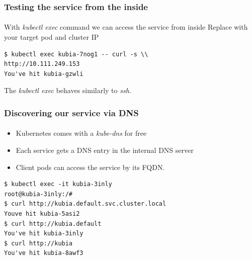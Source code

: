 \begin{frame}[fragile]
	\frametitle{Testing the service from the inside}
	\framesubtitle{}
	With \textit{kubectl exec} command we can access the service from inside
	Replace with your target pod and cluster IP
	\begin{lstlisting}[numbers=none, basicstyle=\ttfamily]
$ kubectl exec kubia-7nog1 -- curl -s \\
http://10.111.249.153
You've hit kubia-gzwli
	\end{lstlisting}
	The \textit{kubectl exec} behaves similarly to \textit{ssh}.
\end{frame}


\begin{frame}[fragile]
	\frametitle{Discovering our service via DNS}
	\framesubtitle{}
	\begin{itemize}
		\item Kubernetes comes with a \textit{kube-dns} for free
		\item Each service gets a DNS entry in the internal DNS server
		\item Client pods can access the service by its FQDN.
	\end{itemize}
	\begin{lstlisting}[numbers=none, basicstyle=\ttfamily]
$ kubectl exec -it kubia-3inly
root@kubia-3inly:/#
$ curl http://kubia.default.svc.cluster.local
Youve hit kubia-5asi2
$ curl http://kubia.default
You've hit kubia-3inly
$ curl http://kubia
You've hit kubia-8awf3
	\end{lstlisting}
\end{frame}

